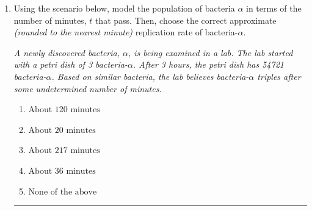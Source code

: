 \documentclass[14pt]{extbook}
\newcommand{\litem}[1]{\item#1\hspace*{-1cm}\rule{\textwidth}{0.4pt}}
\begin{document}
\begin{enumerate}
{\begin{enumerate}[label=\Alph*.]
\end{enumerate} }
\litem{
Using the scenario below, model the population of bacteria $\alpha$ in terms of the number of minutes, $t$ that pass. Then, choose the correct approximate \textit{(rounded to the nearest minute)} replication rate of bacteria-$\alpha$.
\begin{center}
    \textit{ A newly discovered bacteria, $\alpha$, is being examined in a lab. The lab started with a petri dish of 3 bacteria-$\alpha$. After 3 hours, the petri dish has 54721 bacteria-$\alpha$. Based on similar bacteria, the lab believes bacteria-$\alpha$ triples after some undetermined number of minutes. }
\end{center}
\begin{enumerate}[label=\Alph*.]
\item \( \text{About } 120 \text{ minutes} \)
\item \( \text{About } 20 \text{ minutes} \)
\item \( \text{About } 217 \text{ minutes} \)
\item \( \text{About } 36 \text{ minutes} \)
\item \( \text{None of the above} \)

\end{enumerate} }
\end{enumerate}
\end{document}
